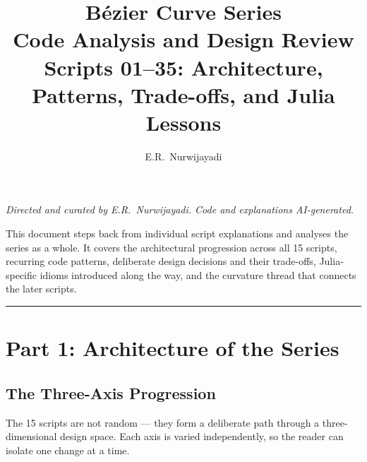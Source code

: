 \documentclass[12pt, a4paper]{article}
\title{%
  \vspace{1cm}
  {\LARGE\bfseries B\'ezier Curve Series}\\[0.4em]
  {\large Code Analysis and Design Review}\\[0.4em]
  {\normalsize Scripts 01--35: Architecture, Patterns,
   Trade-offs, and Julia Lessons}
}
\author{E.R.\ Nurwijayadi}
\date{\DTMtoday}
\begin{document}
\maketitle
\thispagestyle{empty}

\begin{center}
\textit{Directed and curated by E.R.\ Nurwijayadi.
Code and explanations AI-generated.}
\end{center}

\begin{center}
\begin{minipage}{0.85\textwidth}
\small
This document steps back from individual script explanations
and analyses the series as a whole.
It covers the architectural progression across all 15 scripts,
recurring code patterns, deliberate design decisions and
their trade-offs, Julia-specific idioms introduced along the
way, and the curvature thread that connects the later scripts.
\end{minipage}
\end{center}

\vspace{1em}\hrule\vspace{1.5em}
\tableofcontents
\newpage


\section{Part 1: Architecture of the Series}

\subsection{The Three-Axis Progression}

The 15 scripts are not random --- they form a deliberate
path through a three-dimensional design space.
Each axis is varied independently, so the reader can
isolate one change at a time.

\bigskip
\end{document}
